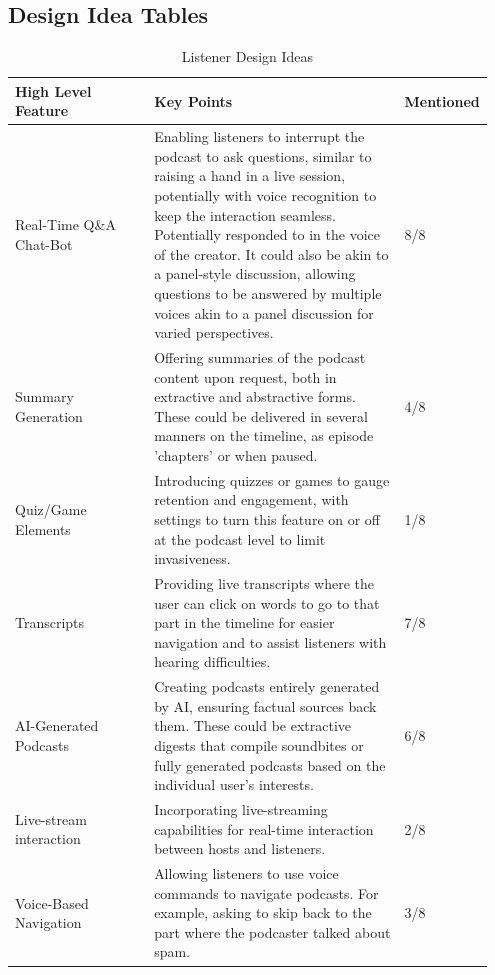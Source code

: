 \documentclass[12pt]{report}
\begin{document}
\begin{myfont}
        \chapter{Design Idea Tables}
        \label{app:C}

        \begin{longtable}{p{0.3\linewidth} | p{0.55\linewidth} | p{0.1\linewidth} }
            \caption{Listener Design Ideas}
            \label{tab:listener_design_ideas}\\
            \toprule
            \textbf{High Level Feature} & \textbf{Key Points} & \textbf{Mentioned} \\
            \midrule
            Real-Time Q\&A Chat-Bot & Enabling listeners to interrupt the podcast to ask questions, similar to raising a hand in a live session, potentially with voice recognition to keep the interaction seamless. Potentially responded to in the voice of the creator. It could also be akin to a panel-style discussion, allowing questions to be answered by multiple voices akin to a panel discussion for varied perspectives. & 8/8\\
            \midrule
            Summary Generation & Offering summaries of the podcast content upon request, both in extractive and abstractive forms. These could be delivered in several manners on the timeline, as episode 'chapters' or when paused. & 4/8\\
            \midrule
            Quiz/Game Elements & Introducing quizzes or games to gauge retention and engagement, with settings to turn this feature on or off at the podcast level to limit invasiveness. & 1/8\\
            \midrule
            Transcripts & Providing live transcripts where the user can click on words to go to that part in the timeline for easier navigation and to assist listeners with hearing difficulties. & 7/8\\
            \midrule
            AI-Generated Podcasts & Creating podcasts entirely generated by AI, ensuring factual sources back them. These could be extractive digests that compile soundbites or fully generated podcasts based on the individual user's interests. & 6/8\\
            \midrule
            Live-stream interaction & Incorporating live-streaming capabilities for real-time interaction between hosts and listeners. & 2/8\\
            \midrule
            Voice-Based Navigation & Allowing listeners to use voice commands to navigate podcasts. For example, asking to skip back to the part where the podcaster talked about spam. & 3/8\\

\end{longtable}
\end{myfont}
\end{document}

